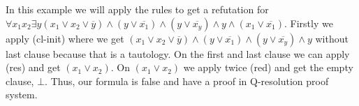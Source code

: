 \begin{example}
    In this example we will apply the rules to get a refutation for $\forall x_1 x_2 \exists y (x_1 \lor x_2 \lor \overline{y}) \land (y \lor \overline{x_1}) \land (y \lor \overline{x_y}) \land y \land (x_1 \lor \overline{x_1})$. Firstly we apply (cl-init) where we get $(x_1 \lor x_2 \lor \overline{y}) \land (y \lor \overline{x_1}) \land (y \lor \overline{x_y}) \land y$ without last clause because that is a tautology. On the first and last clause we can apply (res) and get $(x_1 \lor x_2)$. On $(x_1 \lor x_2)$ we apply twice (red) and get the empty clause, $\bot$. Thus, our formula is false and have a proof in Q-resolution proof system.
\end{example}